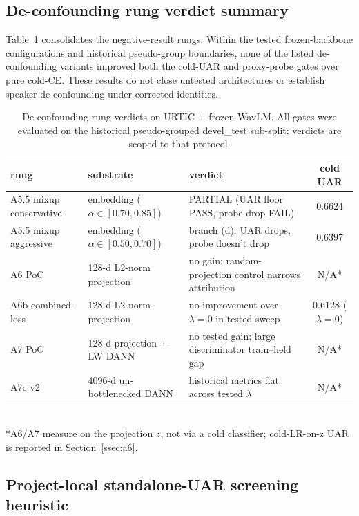 \subsection{De-confounding rung verdict summary}

Table~\ref{tab:closure_full} consolidates the negative-result rungs. Within the tested frozen-backbone configurations and historical pseudo-group boundaries, none of the listed de-confounding variants improved both the cold-UAR and proxy-probe gates over pure cold-CE. These results do not close untested architectures or establish speaker de-confounding under corrected identities.

\begin{table}[t]
\centering\small
\caption{De-confounding rung verdicts on URTIC + frozen WavLM. All gates were evaluated on the historical pseudo-grouped devel\_test sub-split; verdicts are scoped to that protocol.}
\label{tab:closure_full}
\begin{tabular}{lllc}
\toprule
rung               & substrate           & verdict                                 & cold UAR \\
\midrule
A5.5 mixup conservative  & embedding ($\alpha\in[0.70, 0.85]$)  & PARTIAL (UAR floor PASS, probe drop FAIL) & $0.6624$ \\
A5.5 mixup aggressive    & embedding ($\alpha\in[0.50, 0.70]$)  & branch (d): UAR drops, probe doesn't drop & $0.6397$ \\
A6 PoC                   & 128-d L2-norm projection             & no gain; random-projection control narrows attribution & N/A* \\
A6b combined-loss        & 128-d L2-norm projection             & no improvement over $\lambda=0$ in tested sweep & $0.6128$ ($\lambda=0$) \\
A7 PoC                   & 128-d projection + LW DANN           & no tested gain; large discriminator train--held gap & N/A* \\
A7c v2                   & 4096-d un-bottlenecked DANN          & historical metrics flat across tested $\lambda$ & N/A* \\
\bottomrule
\end{tabular}
\\[2pt]
\footnotesize{*A6/A7 measure on the projection $z$, not via a cold classifier; cold-LR-on-z UAR is reported in Section~\ref{ssec:a6}.}
\end{table}

\subsection{Project-local standalone-UAR screening heuristic}
\label{ssec:standalone_predictor}

